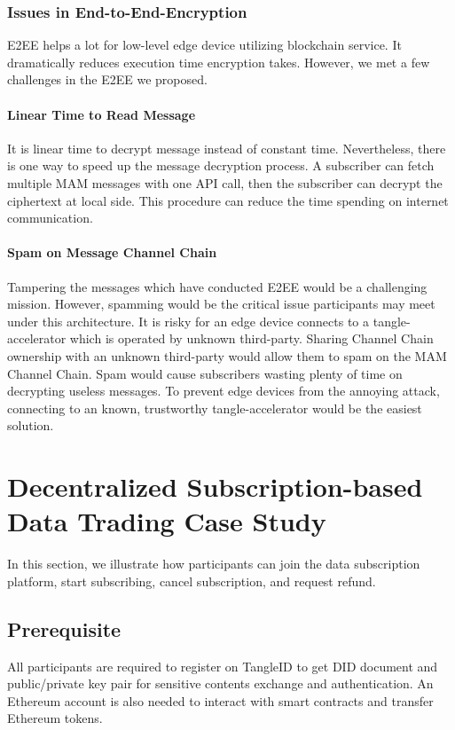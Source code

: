 \documentclass[conference]{IEEEtran}
\begin{document}
\subsubsection{Issues in End-to-End-Encryption}
E2EE helps a lot for low-level edge device utilizing blockchain service. It dramatically reduces execution time encryption takes. However, we met a few challenges in the E2EE we proposed.

\paragraph{Linear Time to Read Message}
It is linear time to decrypt message instead of constant time. Nevertheless, there is one way to speed up the message decryption process. A subscriber can fetch multiple MAM messages with one API call, then the subscriber can decrypt the ciphertext at local side. This procedure can reduce the time spending on internet communication.

\paragraph{Spam on Message Channel Chain}
Tampering the messages which have conducted E2EE would be a challenging mission. However, spamming would be the critical issue participants may meet under this architecture. It is risky for an edge device connects to a tangle-accelerator which is operated by unknown third-party. Sharing Channel Chain ownership with an unknown third-party would allow them to spam on the MAM Channel Chain. Spam would cause subscribers wasting plenty of time on decrypting useless messages. To prevent edge devices from the annoying attack, connecting to an known, trustworthy tangle-accelerator would be the easiest solution.

\section{Decentralized Subscription-based Data Trading Case Study}
In this section, we illustrate how participants can join the data subscription platform, start subscribing, cancel subscription, and request refund.

\subsection{Prerequisite}
All participants are required to register on TangleID to get DID document and public/private key pair for sensitive contents exchange and authentication. An Ethereum account is also needed to interact with smart contracts and transfer Ethereum tokens.
\end{document}
